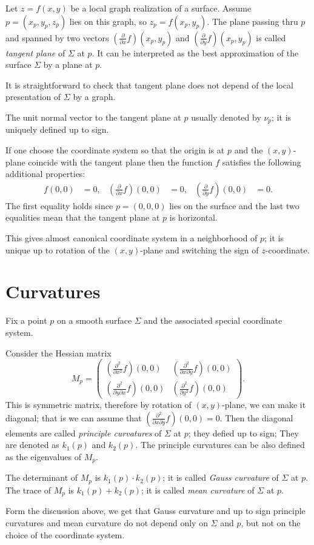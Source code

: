 Let $z=f(x,y)$ be a local graph realization of a surface. 
Assume $p=(x_p,y_p,z_p)$ lies on this graph, so $z_p=f(x_p,y_p)$.
The plane passing thru $p$ and spanned by two vectors $(\tfrac{\partial}{\partial x}f)(x_p,y_p)$ and  $(\tfrac{\partial}{\partial y}f)(x_p,y_p)$ is called \emph{tangent plane} of $\Sigma$ at $p$.
It can be interpreted as the best approximation of the surface $\Sigma$ by a plane at $p$.

It is straightforward to check that tangent plane does not depend of the local presentation of $\Sigma$ by a graph.

The unit normal vector to the tangent plane at $p$ usually denoted by $\nu_p$; it is uniquely defined up to sign.  

If one choose the coordinate system so that the origin is at $p$ and the $(x,y)$-plane coincide with the tangent plane then the function $f$ satisfies the following additional properties:
\begin{align*}
f(0,0)&=0,
&
(\tfrac{\partial}{\partial x}f)(0,0)&=0,
&
(\tfrac{\partial}{\partial y}f)(0,0)&=0.
\end{align*}
The first equality holds since $p=(0,0,0)$ lies on the surface and the last two equalities mean that the tangent plane at $p$ is horizontal.

This gives almost canonical coordinate system in a neighborhood of $p$;
it is unique up to rotation of  the $(x,y)$-plane and switching the sign of $z$-coordinate.

\section{Curvatures}

Fix a point $p$ on a smooth surface $\Sigma$ and the associated special coordinate system. 

Consider the Hessian matrix 
\[M_p=\begin{pmatrix}
   (\tfrac{\partial^2}{\partial x^2}f)(0,0)
   &(\tfrac{\partial^2}{\partial x\partial y}f)(0,0)
   \\
   (\tfrac{\partial^2}{\partial y\partial x}f)(0,0)
   &(\tfrac{\partial^2}{\partial y^2}f)(0,0)
  \end{pmatrix}.
\]
This is symmetric matrix, therefore by rotation of $(x,y)$-plane, we can make it diagonal;
that is we can assume that $(\tfrac{\partial^2}{\partial x\partial y}f)(0,0)=0$.
Then the diagonal elements are called \emph{principle curvatures} of $\Sigma$ at $p$;
they defied up to sign;
They are denoted as $k_1(p)$ and $k_2(p)$.
The principle curvatures can be also defined as the eigenvalues of $M_p$.

The determinant of $M_p$ is $k_1(p)\cdot k_2(p)$;
it is called \emph{Gauss curvature} of $\Sigma$ at $p$.
The trace of $M_p$ is $k_1(p)+ k_2(p)$;
it is called \emph{mean curvature} of $\Sigma$ at $p$.

Form the discussion above, 
we get that Gauss curvature and up to sign principle curvatures and mean curvature 
do not depend only on $\Sigma$ and $p$,
but not on the choice of the coordinate system.




